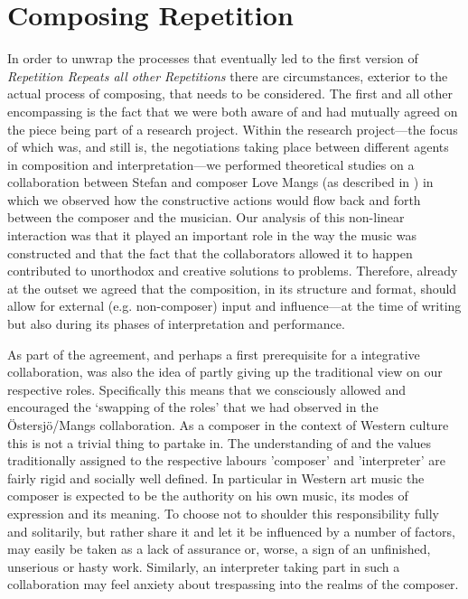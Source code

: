 \section{Composing Repetition}
\label{sec:composing-repetition}

In order to unwrap the processes that eventually led to the first
version of \emph{Repetition Repeats all other Repetitions} there are
circumstances, exterior to the actual process of composing, that needs
to be considered. The first and all other encompassing is the fact
that we were both aware of and had mutually agreed on the piece being
part of a research project. Within the research project---the focus of
which was, and still is, the negotiations taking place between
different agents in composition and interpretation---we performed
theoretical studies on a collaboration between Stefan and composer
Love Mangs (as described in \citet{frisk-ost06}) in which we observed
how the constructive actions would flow back and forth between the
composer and the musician. Our analysis of this non-linear interaction
was that it played an important role in the way the music was
constructed and that the fact that the collaborators allowed it to
happen contributed to unorthodox and creative solutions to
problems. Therefore, already at the outset we agreed that the
composition, in its structure and format, should allow for external
(e.g. non-composer) input and influence---at the time of writing but
also during its phases of interpretation and performance.

As part of the agreement, and perhaps a first prerequisite for a
integrative collaboration, was also the idea of partly giving up the
traditional view on our respective roles. Specifically this means that
we consciously allowed and encouraged the `swapping of the roles' that
we had observed in the \"{O}stersj\"{o}/Mangs collaboration. As a
composer in the context of Western culture this is not a trivial thing
to partake in. The understanding of and the values traditionally
assigned to the respective labours 'composer' and 'interpreter' are
fairly rigid and socially well defined. In particular in Western art
music the composer is expected to be the authority on his own music,
its modes of expression and its meaning. To choose not to shoulder
this responsibility fully and solitarily, but rather share it and let
it be influenced by a number of factors, may easily be taken as a lack
of assurance or, worse, a sign of an unfinished, unserious or hasty
work. Similarly, an interpreter taking part in such a collaboration
may feel anxiety about trespassing into the realms of the composer.

